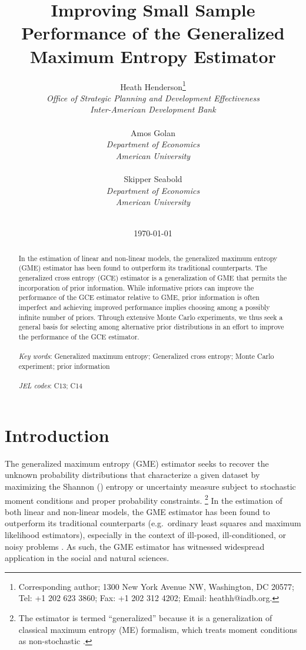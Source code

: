 \documentclass[english]{article}
\title{Improving Small Sample Performance of the Generalized Maximum 
Entropy Estimator}
\author{
Heath Henderson\thanks{Corresponding author; 1300 New York Avenue 
NW, Washington, DC 20577; Tel: +1 202 623 3860; Fax: +1 202 312 4202; 
Email: heathh@iadb.org.}\\
\textit{Office of Strategic Planning and Development Effectiveness} \\
\textit{Inter-American Development Bank} \\
\\
Amos Golan \\
\textit{Department of Economics}\\
\textit{American University} \\
\\
Skipper Seabold \\
\textit{Department of Economics}\\
\textit{American University}
\\ \\
}
\date{\today}
\begin{document}

\begin{titlepage}
\maketitle

\begin{abstract}
In the estimation of linear and non-linear models, the generalized maximum 
entropy (GME) estimator has been found to outperform its traditional 
counterparts.
The generalized cross entropy (GCE) estimator is a generalization of GME
that permits the incorporation of prior information.
While informative priors can improve the performance of the GCE estimator 
relative to GME, prior information is often imperfect and achieving improved 
performance implies choosing among a possibly infinite number of priors.
Through extensive Monte Carlo experiments, we thus seek a general basis for 
selecting among alternative prior distributions in an effort to improve the 
performance of the GCE estimator. \\
~\\
\textit{Key words}: Generalized maximum entropy; Generalized cross 
entropy; Monte Carlo experiment; prior information\\
~ \\
\textit{JEL codes}: C13; C14  
\end{abstract}
\thispagestyle{empty}
\end{titlepage}
\newpage


\doublespacing


\section{Introduction}
\label{sec: intro}

The generalized maximum entropy (GME) estimator seeks to recover the 
unknown probability distributions that characterize a given dataset by 
maximizing the Shannon (\citeyear{shannon1948}) entropy or uncertainty 
measure subject to stochastic moment conditions and proper probability 
constraints.%
\footnote{The estimator is termed ``generalized'' because it is a 
generalization of classical maximum entropy (ME) formalism, which treats
moment conditions as non-stochastic \citep{jaynes1957a, jaynes1957b}.}
In the estimation of both linear and non-linear models, the GME estimator
has been found to outperform its traditional counterparts (e.g.\ ordinary 
least squares and maximum likelihood estimators), especially in the context 
of ill-posed, ill-conditioned, or noisy problems \citep{golan1996}.
As such, the GME estimator has witnessed widespread application in the 
social and natural sciences.
\end{document}
